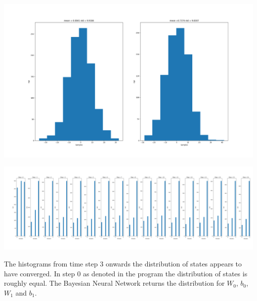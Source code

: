 \documentclass[]{article}
\begin{document}
	\begin{center}
		\includegraphics[width=\textwidth]{Eval/BayesianLinearReg.png}
	\end{center}



	\begin{center}
		\includegraphics[width=\textwidth]{Eval/HMM.png}
	\end{center}

The histograms from time step 3 onwards the distribution of states appears to have converged. In step 0 as denoted in the program the distribution of states is roughly equal.
\newpage
The Bayesian Neural Network returns the distribution for $W_0$, $b_0$, $W_1$ and $b_1$.
\end{document}
